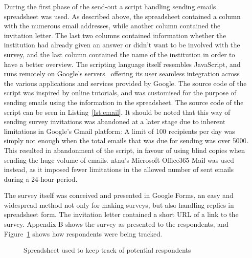 During the first phase of the send-out a script handling sending emails spreadsheet was used. As described above, the spreadsheet contained a column with the numerous email addresses, while another column contained the invitation letter. The last two columns contained information whether the institution had already given an answer or didn't want to be involved with the survey, and the last column contained the name of the institution in order to have a better overview. The scripting language itself resembles JavaScript, and runs remotely on Google's servers~\cite{google2016} offering its user seamless integration across the various applications and services provided by Google. The source code of the script was inspired by online tutorials, and was customised for the purpose of sending emails using the information in the spreadsheet. The source code of the script can be seen in Listing~\ref{lst:email}. It should be noted that this way of sending survey invitations was abandoned at a later stage due to inherent limitations in Google's Gmail platform: A limit of 100 recipients per day was simply not enough when the total emails that was due for sending was over 5000. This resulted in abandonment of the script, in favour of using blind copies when sending the huge volume of emails. \gls{ntnu}'s Microsoft Office365 Mail was used instead, as it imposed fewer limitations in the allowed number of sent emails during a 24-hour period.


The survey itself was conceived and presented in Google Forms, an easy and widespread method not only for making surveys, but also handling replies in spreadsheet form. The invitation letter contained a short URL of a link to the survey. Appendix B shows the survey as presented to the respondents, and Figure~\ref{fig:contactsheet} shows how respondents were being tracked.


\begin{figure}
    \centering
    \caption{Spreadsheet used to keep track of potential respondents}
    \label{fig:contactsheet}
\end{figure}

